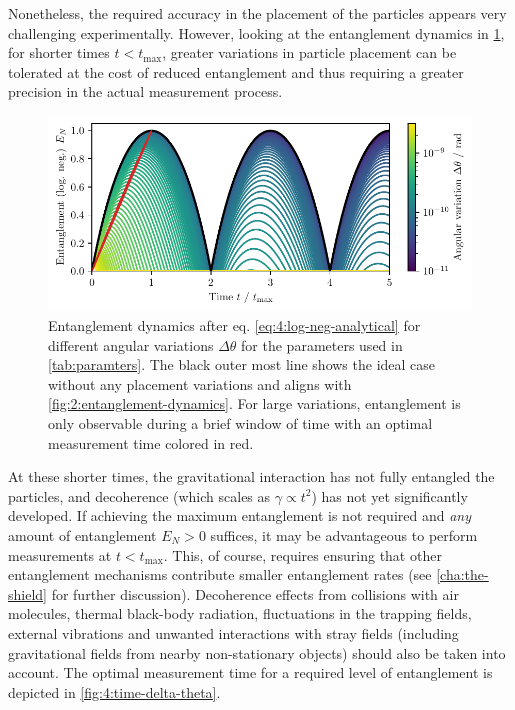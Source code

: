 Nonetheless, the required accuracy in the placement of the particles appears very challenging experimentally.
However, looking at the entanglement dynamics in \cref{fig:4:EN-dynamics-variations}, for shorter times $t<t_\mathrm{max}$, greater variations in particle placement can be tolerated at the cost of reduced entanglement and thus requiring a greater precision in the actual measurement process.
\begin{figure}[!htbp]
  \centering
  \includegraphics[width=\textwidth]{./../figures/theta-variance/EN-dynamics-delta-theta.pdf}
  \caption{Entanglement dynamics after eq. \eqref{eq:4:log-neg-analytical} for different angular variations $\Delta \theta$ for the parameters used in \cref{tab:paramters}. The black outer most line shows the ideal case without any placement variations and aligns with \cref{fig:2:entanglement-dynamics}. For large variations, entanglement is only observable during a brief window of time with an optimal measurement time colored in red.}
  \label{fig:4:EN-dynamics-variations}
\end{figure}
At these shorter times, the gravitational interaction has not fully entangled the particles, and decoherence (which scales as $\gamma \propto t^2$) has not yet significantly developed.
If achieving the maximum entanglement is not required and \textit{any} amount of entanglement $E_N > 0$ suffices, it may be advantageous to perform measurements at $t < t_\mathrm{max}$.
This, of course, requires ensuring that other entanglement mechanisms contribute smaller entanglement rates (see \cref{cha:the-shield} for further discussion).
Decoherence effects from collisions with air molecules, thermal black-body radiation, fluctuations in the trapping fields, external vibrations and unwanted interactions with stray fields (including gravitational fields from nearby non-stationary objects) should also be taken into account.
The optimal measurement time for a required level of entanglement is depicted in \cref{fig:4:time-delta-theta}.
